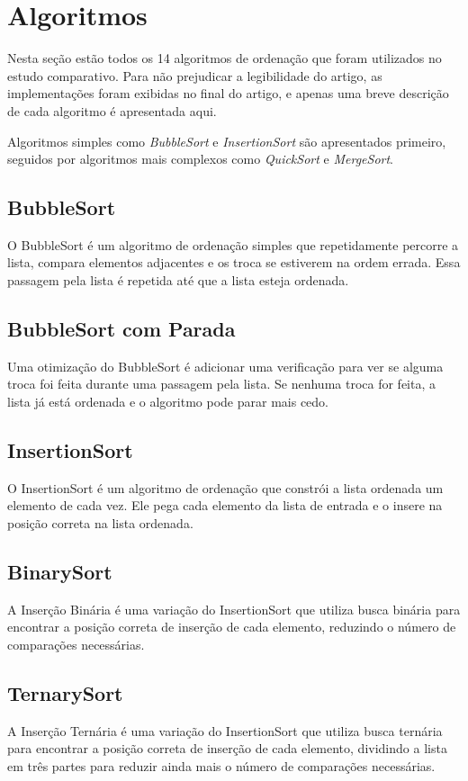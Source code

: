 \documentclass[a4paper, 12pt]{article} %
\begin{document}
\section{Algoritmos}
Nesta seção estão todos os 14 algoritmos de ordenação que foram utilizados no estudo comparativo. Para não prejudicar a legibilidade do artigo, as implementações foram exibidas no final do artigo, e apenas uma breve descrição de cada algoritmo é apresentada aqui.

Algoritmos simples como \textit{BubbleSort} e \textit{InsertionSort} são apresentados primeiro, seguidos por algoritmos mais complexos como \textit{QuickSort} e \textit{MergeSort}.

\subsection{BubbleSort}
O BubbleSort é um algoritmo de ordenação simples que repetidamente percorre a lista, compara elementos adjacentes e os troca se estiverem na ordem errada.
Essa passagem pela lista é repetida até que a lista esteja ordenada.

\subsection{BubbleSort com Parada}
Uma otimização do BubbleSort é adicionar uma verificação para ver se alguma troca foi feita durante uma passagem pela lista.
Se nenhuma troca for feita, a lista já está ordenada e o algoritmo pode parar mais cedo.

\subsection{InsertionSort}
O InsertionSort é um algoritmo de ordenação que constrói a lista ordenada um elemento de cada vez. Ele pega cada elemento da lista de entrada e o insere na posição correta na lista ordenada.

\subsection{BinarySort}
A Inserção Binária é uma variação do InsertionSort que utiliza busca binária para encontrar a posição correta de inserção de cada elemento, reduzindo o número de comparações necessárias.

\subsection{TernarySort}
A Inserção Ternária é uma variação do InsertionSort que utiliza busca ternária para encontrar a posição correta de inserção de cada elemento, dividindo a lista em três partes para reduzir ainda mais o número de comparações necessárias.
\end{document}
